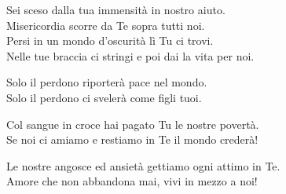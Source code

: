 
\strofa Sei sceso dalla tua immensità in nostro aiuto.\\
Misericordia scorre da Te sopra tutti noi.\\
Persi in un mondo d'oscurità lì Tu ci trovi.\\
Nelle tue braccia ci stringi e poi dai la vita per noi.

\spazio

 

\spazio

\strofa Solo il perdono riporterà pace nel mondo.\\
Solo il perdono ci svelerà come figli tuoi.

\spazio


\spazio

\strofa Col sangue in croce hai pagato Tu le nostre povertà.\\
Se noi ci amiamo e restiamo in Te il mondo crederà!

\spazio


\spazio

\strofa Le nostre angosce ed ansietà gettiamo ogni attimo in Te.\\
Amore che non abbandona mai, vivi in mezzo a noi!

\spazio

